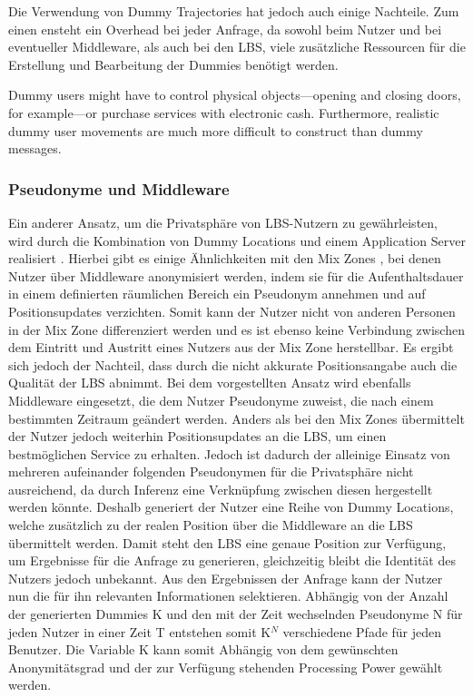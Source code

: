 Die Verwendung von Dummy Trajectories hat jedoch auch einige Nachteile. Zum einen ensteht ein Overhead bei jeder Anfrage, da sowohl beim Nutzer und bei eventueller Middleware, als auch bei den LBS, viele zusätzliche Ressourcen für die Erstellung und Bearbeitung der Dummies benötigt werden.

Dummy users might have to control physical objects—opening
and closing doors, for example—or purchase services with
electronic cash. Furthermore, realistic dummy user movements
are much more difficult to construct than dummy messages.


\subsubsection{Pseudonyme und Middleware}
Ein anderer Ansatz, um die Privatsphäre von LBS-Nutzern zu gewährleisten, wird durch die Kombination von Dummy Locations und einem Application Server realisiert \cite{Sahu2012}. Hierbei gibt es einige Ähnlichkeiten mit den Mix Zones \cite{Beresford2003}, bei denen Nutzer über Middleware anonymisiert werden, indem sie für die Aufenthaltsdauer in einem definierten räumlichen Bereich ein Pseudonym annehmen und auf Positionsupdates verzichten. Somit kann der Nutzer nicht von anderen Personen in der Mix Zone differenziert werden und es ist ebenso keine Verbindung zwischen dem Eintritt und Austritt eines Nutzers aus der Mix Zone herstellbar. Es ergibt sich jedoch der Nachteil, dass durch die nicht akkurate Positionsangabe auch die Qualität der LBS abnimmt. 
Bei dem vorgestellten Ansatz wird ebenfalls Middleware eingesetzt, die dem Nutzer Pseudonyme zuweist, die nach einem bestimmten Zeitraum geändert werden. Anders als bei den Mix Zones übermittelt der Nutzer jedoch weiterhin Positionsupdates an die LBS, um einen bestmöglichen Service zu erhalten. Jedoch ist dadurch der alleinige Einsatz von mehreren aufeinander folgenden Pseudonymen für die Privatsphäre nicht ausreichend, da durch Inferenz eine Verknüpfung zwischen diesen hergestellt werden könnte. Deshalb generiert der Nutzer eine Reihe von Dummy Locations, welche zusätzlich zu der realen Position über die Middleware an die LBS übermittelt werden. Damit steht den LBS eine genaue Position zur Verfügung, um Ergebnisse für die Anfrage zu generieren, gleichzeitig bleibt die Identität des Nutzers jedoch unbekannt. Aus den Ergebnissen der Anfrage kann der Nutzer nun die für ihn relevanten Informationen selektieren.
Abhängig von der Anzahl der generierten Dummies K und den mit der Zeit wechselnden Pseudonyme N für jeden Nutzer in einer Zeit T entstehen somit K$^{N}$ verschiedene Pfade für jeden Benutzer. Die Variable K kann somit Abhängig von dem gewünschten Anonymitätsgrad und der zur Verfügung stehenden Processing Power gewählt werden.

